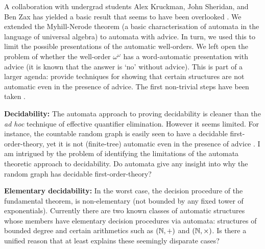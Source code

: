 \documentclass[12pt]{article}
\theoremstyle{plain} \numberwithin{equation}{section}
\theoremstyle{definition}
\begin{document}
A collaboration with undergrad students Alex Kruckman,  John Sheridan, and Ben Zax has yielded a basic result that seems to have been overlooked \cite{KRSZ}. We extended the Myhill-Nerode theorem (a basic characterisation of automata in the language of universal algebra) to automata with advice. In turn, we used this to limit the possible presentations of the automatic well-orders.
We left open the problem of whether the well-order $\omega^\omega$ has a word-automatic presentation with advice (it is known that the answer is `no' without advice).
This is part of a larger agenda: provide techniques for showing that certain structures are not automatic even in the presence of advice. The first non-trivial steps have been taken \cite{CoLo06}.

{\bf Decidability:} The automata approach to proving decidability is cleaner than the {\it ad hoc} technique of effective quantifier elimination. However it seems limited. For instance, the countable random graph is easily seen to have a decidable first-order-theory, yet it is not (finite-tree) automatic even in the presence of advice \cite{CoLo06}.
I am intrigued by the problem of identifying the limitations of the automata theoretic approach to decidability. Do automata give any insight into why the random graph has decidable first-order-theory? 


{\bf Elementary decidability:} In the worst case, the decision procedure of the fundamental theorem, is non-elementary (not bounded by any fixed tower of exponentials). Currently there are two known classes of automatic structures whose members have elementary decision procedures via automata: structures of bounded degree \cite{Lohr03} \cite{KuLo09} and certain arithmetics such as $({\mathbb N},+)$ and $({\mathbb N},\times)$. Is there a unified reason that at least explains these seemingly disparate cases?

\end{document}
